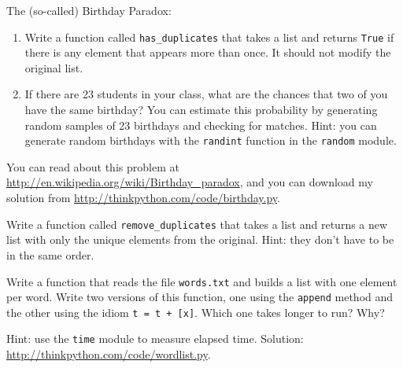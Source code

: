 \documentclass[10pt]{book}
\begin{document}
\begin{exercise}
\label{duplicate}

The (so-called) Birthday Paradox:

\begin{enumerate}

\item Write a function called \verb"has_duplicates" that takes
a list and returns {\tt True} if there is any element that
appears more than once.  It should not modify the original
list.

\item If there are 23 students in your class, what are the chances
that two of you have the same birthday?  You can estimate this
probability by generating random samples of 23 birthdays
and checking for matches.  Hint: you can generate random birthdays
with the {\tt randint} function in the {\tt random} module.

\end{enumerate}

You can read about this problem at
\url{http://en.wikipedia.org/wiki/Birthday_paradox}, and you can download my
solution from \url{http://thinkpython.com/code/birthday.py}.

\end{exercise}


\begin{exercise}

Write a function called \verb"remove_duplicates" that takes
a list and returns a new list with only the unique elements from
the original.  Hint: they don't have to be in the same order.
\end{exercise}


\begin{exercise}

Write a function that reads the file {\tt words.txt} and builds
a list with one element per word.  Write two versions of
this function, one using the {\tt append} method and the
other using the idiom {\tt t = t + [x]}.  Which one takes
longer to run?  Why?

Hint: use the {\tt time} module to measure elapsed time.
Solution: \url{http://thinkpython.com/code/wordlist.py}.

\end{exercise}
\end{document}
